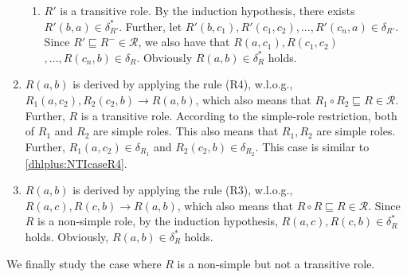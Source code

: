 \begin{enumerate}[leftmargin=12ex,label=Case~2.\arabic*, ref=Case~2.\arabic*]
\begin{enumerate}[leftmargin=8ex,label=Case~2.2.\arabic*]
     \item $R'$ is a transitive role.
        By the induction hypothesis, there exists $R'(b,a)\in\delta^*_{R'}$.
        Further, let $R'(b,c_1),R'(c_1,c_2),...,R'(c_n,a)\in\delta_{R'}$.
        Since $R'\sqsubseteq R^-\in\mathcal{R}$, we also have that
        $R(a,c_1),R(c_1,c_2)$ $,...,R(c_n,b)\in\delta_{R}$. Obviously $R(a,b)\in\delta^*_{R}$ holds.
    \end{enumerate}

\item $R(a,b)$ is derived by applying the rule (R4), w.l.o.g.,
    $R_1(a,c_2),R_2(c_2,b)\rightarrow R(a,b)$,
    which also means that $R_1\circ R_2\sqsubseteq R\in\mathcal{R}$.
    Further, $R$ is a transitive role. According to the simple-role restriction,
    both of $R_1$ and $R_2$ are simple roles.
    This also
    means that $R_1, R_2$ are simple roles. Further, $R_1(a,c_2)\in\delta_{R_1}$ and $R_2(c_2,b)\in\delta_{R_2}$.
    This case is similar to \ref{dhlplus:NTIcaseR4}.

\item $R(a,b)$ is derived by applying the rule (R3), w.l.o.g., $R(a,c),R(c,b)\rightarrow R(a,b)$,
    which also means that $R\circ R\sqsubseteq R\in\mathcal{R}$.
    Since $R$ is a non-simple role, by the induction hypothesis,
    $R(a,c),R(c,b)\in\delta^*_{R}$ holds. Obviously, $R(a,b)\in\delta^*_{R}$ holds.
\end{enumerate}

We finally study the case where $R$ is a non-simple but not a transitive role.

